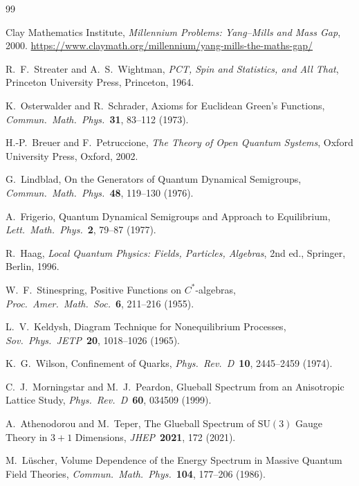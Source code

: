 \documentclass[12pt,a4paper]{article}
\theoremstyle{definition}
\begin{document}
\begin{thebibliography}{99}

  Clay Mathematics Institute,
  \textit{Millennium Problems: Yang--Mills and Mass Gap}, 2000.
  \url{https://www.claymath.org/millennium/yang-mills-the-maths-gap/}

  R.~F.~Streater and A.~S.~Wightman,
  \textit{PCT, Spin and Statistics, and All That},
  Princeton University Press, Princeton, 1964.

  K.~Osterwalder and R.~Schrader,
  Axioms for Euclidean Green's Functions,
  \textit{Commun.\ Math.\ Phys.}\ \textbf{31}, 83--112 (1973).

  H.-P.~Breuer and F.~Petruccione,
  \textit{The Theory of Open Quantum Systems},
  Oxford University Press, Oxford, 2002.

  G.~Lindblad,
  On the Generators of Quantum Dynamical Semigroups,
  \textit{Commun.\ Math.\ Phys.}\ \textbf{48}, 119--130 (1976).

  A.~Frigerio,
  Quantum Dynamical Semigroups and Approach to Equilibrium,
  \textit{Lett.\ Math.\ Phys.}\ \textbf{2}, 79--87 (1977).

  R.~Haag,
  \textit{Local Quantum Physics: Fields, Particles, Algebras},
  2nd ed., Springer, Berlin, 1996.

  W.~F.~Stinespring,
  Positive Functions on $C^{*}$-algebras,
  \textit{Proc.\ Amer.\ Math.\ Soc.}\ \textbf{6}, 211--216 (1955).

  L.~V.~Keldysh,
  Diagram Technique for Nonequilibrium Processes,
  \textit{Sov.\ Phys.\ JETP}\ \textbf{20}, 1018--1026 (1965).

  K.~G.~Wilson,
  Confinement of Quarks,
  \textit{Phys.\ Rev.\ D}\ \textbf{10}, 2445--2459 (1974).

  C.~J.~Morningstar and M.~J.~Peardon,
  Glueball Spectrum from an Anisotropic Lattice Study,
  \textit{Phys.\ Rev.\ D}\ \textbf{60}, 034509 (1999).

  A.~Athenodorou and M.~Teper,
  The Glueball Spectrum of $\mathrm{SU}(3)$ Gauge Theory in $3+1$
  Dimensions,
  \textit{JHEP}\ \textbf{2021}, 172 (2021).

  M.~L\"{u}scher,
  Volume Dependence of the Energy Spectrum in Massive Quantum Field
  Theories,
  \textit{Commun.\ Math.\ Phys.}\ \textbf{104}, 177--206 (1986).


\end{thebibliography}
\end{document}
